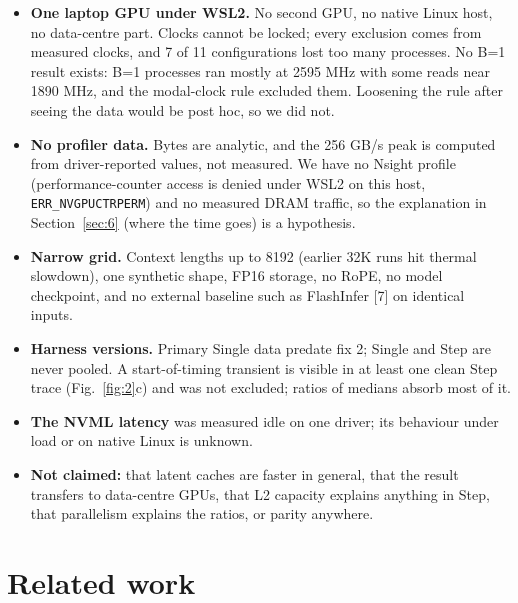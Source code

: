 \documentclass[conference]{IEEEtran}
\providecommand{\tightlist}{}
\begin{document}
\begin{itemize}
\tightlist
\item
  \textbf{One laptop GPU under WSL2.} No second GPU, no native Linux host, no data-centre part. Clocks cannot be locked; every exclusion comes from measured clocks, and 7 of 11 configurations lost too many processes. No B=1 result exists: B=1 processes ran mostly at 2595 MHz with some reads near 1890 MHz, and the modal-clock rule excluded them. Loosening the rule after seeing the data would be post hoc, so we did not.
\item
  \textbf{No profiler data.} Bytes are analytic, and the 256 GB/s peak is computed from driver-reported values, not measured. We have no Nsight profile (performance-counter access is denied under WSL2 on this host, \texttt{ERR\_NVGPUCTRPERM}) and no measured DRAM traffic, so the explanation in Section~\ref{sec:6} (where the time goes) is a hypothesis.
\item
  \textbf{Narrow grid.} Context lengths up to 8192 (earlier 32K runs hit thermal slowdown), one synthetic shape, FP16 storage, no RoPE, no model checkpoint, and no external baseline such as FlashInfer {[}7{]} on identical inputs.
\item
  \textbf{Harness versions.} Primary Single data predate fix 2; Single and Step are never pooled. A start-of-timing transient is visible in at least one clean Step trace (Fig.~\ref{fig:2}c) and was not excluded; ratios of medians absorb most of it.
\item
  \textbf{The NVML latency} was measured idle on one driver; its behaviour under load or on native Linux is unknown.
\item
  \textbf{Not claimed:} that latent caches are faster in general, that the result transfers to data-centre GPUs, that L2 capacity explains anything in Step, that parallelism explains the ratios, or parity anywhere.
\end{itemize}

\section{Related work}\label{sec:8}
\end{document}
